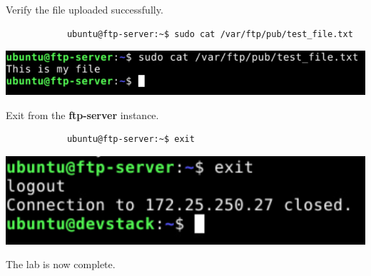 \documentclass[letterpaper, 12pt]{article}
\begin{document}
\begin{enumerate}
    \begin{labstep}
        Verify the file uploaded successfully.
        \begin{lstlisting}
            ubuntu@ftp-server:~$ sudo cat /var/ftp/pub/test_file.txt
        \end{lstlisting}

        \begin{center}
            \includegraphics[width=\linewidth]{images/part2/step21.png}
        \end{center}
    \end{labstep}

    \begin{labstep}
        Exit from the \textbf{ftp-server} instance.
        \begin{lstlisting}
            ubuntu@ftp-server:~$ exit
        \end{lstlisting}

        \begin{center}
            \includegraphics[width=\linewidth]{images/part2/step22.png}
        \end{center}
    \end{labstep}

    \begin{labstep}
        The lab is now complete.
    \end{labstep}

\end{enumerate}
\end{document}
